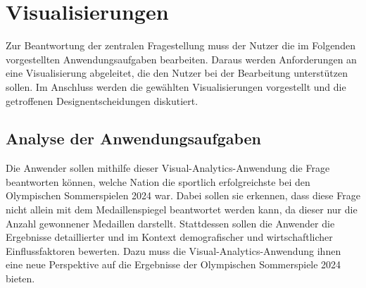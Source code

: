 \section{Visualisierungen}
Zur Beantwortung der zentralen Fragestellung muss der Nutzer die im Folgenden vorgestellten Anwendungsaufgaben bearbeiten. Daraus werden Anforderungen an eine Visualisierung abgeleitet, die den Nutzer bei der Bearbeitung unterstützen sollen. Im Anschluss werden die gewählten Visualisierungen vorgestellt und die getroffenen Designentscheidungen diskutiert.
\subsection{Analyse der Anwendungsaufgaben}\label{subsec:aufgabe}


Die Anwender sollen mithilfe dieser Visual-Analytics-Anwendung die Frage beantworten können, welche Nation die sportlich erfolgreichste bei den Olympischen Sommerspielen 2024 war. Dabei sollen sie erkennen, dass diese Frage nicht allein mit dem Medaillenspiegel beantwortet werden kann, da dieser nur die Anzahl gewonnener Medaillen darstellt. Stattdessen sollen die Anwender die Ergebnisse detaillierter und im Kontext demografischer und wirtschaftlicher Einflussfaktoren bewerten. Dazu muss die Visual-Analytics-Anwendung ihnen eine neue Perspektive auf die Ergebnisse der Olympischen Sommerspiele 2024 bieten.

